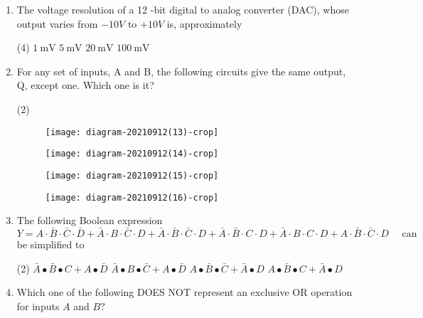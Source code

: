 \begin{enumerate}
	\item The voltage resolution of a 12 -bit digital to analog converter (DAC), whose output varies from $-10 V$ to $+10 V$ is, approximately
	{	}
	\begin{tasks}(4)
		\task[\textbf{A.}] $1\  \mathrm{mV}$
		\task[\textbf{B.}] $5 \ \mathrm{mV}$
		\task[\textbf{C.}] $20 \ \mathrm{mV}$
		\task[\textbf{D.}] $100 \ \mathrm{mV}$
	\end{tasks}
	\item For any set of inputs, A and B, the following circuits give the same output, Q, except one. Which one is it?
	{	}
	\begin{tasks}(2)
		\task[\textbf{A.}] \begin{figure}[H]
			\centering
			\texttt{[image: diagram-20210912(13)-crop]}
		\end{figure}
		\task[\textbf{B.}]\begin{figure}[H]
			\centering
			\texttt{[image: diagram-20210912(14)-crop]}
		\end{figure}
		\task[\textbf{C.}] \begin{figure}[H]
			\centering
			\texttt{[image: diagram-20210912(15)-crop]}
		\end{figure}
		\task[\textbf{D.}]\begin{figure}[H]
			\centering
			\texttt{[image: diagram-20210912(16)-crop]}
		\end{figure}
	\end{tasks}
	\item The following Boolean expression
	$$
	Y=A \cdot \bar{B} \cdot \bar{C} \cdot \bar{D}+\bar{A} \cdot B \cdot \bar{C} \cdot D+\bar{A} \cdot \bar{B} \cdot \bar{C} \cdot D+\bar{A} \cdot \bar{B} \cdot C \cdot D+\bar{A} \cdot B \cdot C \cdot D+A \cdot \bar{B} \cdot \bar{C} \cdot D \quad \text { can }
	$$
	be simplified to
	{	}
	\begin{tasks}(2)
		\task[\textbf{A.}] $\bar{A} \bullet \bar{B} \bullet C+A \bullet \bar{D}$
		\task[\textbf{B.}]  $\bar{A} \bullet B \bullet \bar{C}+A \bullet \bar{D}$
		\task[\textbf{C.}] $A \bullet \bar{B} \bullet \bar{C}+\bar{A} \bullet D$
		\task[\textbf{D.}]  $A \bullet \bar{B} \bullet C+\bar{A} \bullet D$
	\end{tasks}
	\item Which one of the following DOES NOT represent an exclusive OR operation for inputs $A$ and $B ?$

\end{enumerate}
